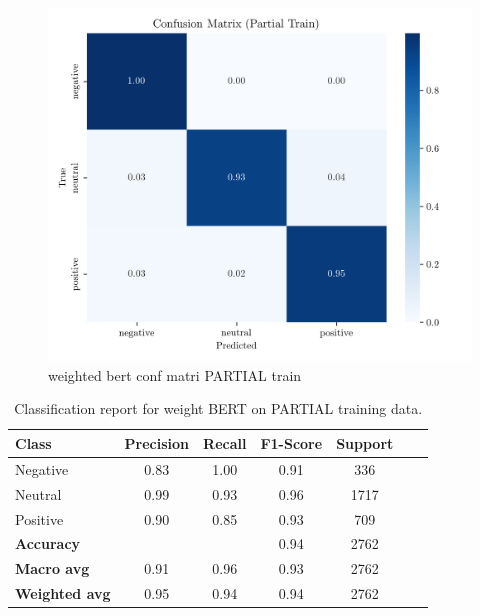 \documentclass[conference]{IEEEtran}
\begin{document}
\begin{figure}[H]
    \centering
    \includegraphics[width=1\linewidth]{assets/weighted_bert_confusion_matrix_Partial Train.png}
    \caption{weighted bert conf matri PARTIAL train}
    \label{fig:weighted_bert_confusion_matrix_Partial}
\end{figure}

\begin{table}[H]
\centering
\caption{Classification report for weight BERT on PARTIAL training data.}
\label{cr_weightbert_train}
\begin{tabular}{lcccccc}
\toprule
\textbf{Class} & \textbf{Precision} & \textbf{Recall} & \textbf{F1-Score} & \textbf{Support} \\
\midrule
Negative & 0.83 & 1.00 & 0.91 & 336 \\
Neutral & 0.99 & 0.93 & 0.96 & 1717 \\
Positive & 0.90 & 0.85 & 0.93 & 709 \\
\midrule
\textbf{Accuracy} &  &  & 0.94 & 2762 \\
\textbf{Macro avg} & 0.91 & 0.96 & 0.93 & 2762 \\
\textbf{Weighted avg} & 0.95 & 0.94 & 0.94 & 2762 \\
\bottomrule
\end{tabular}
\end{table}
\end{document}
